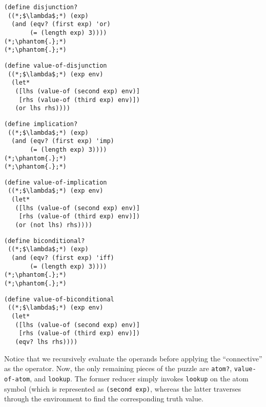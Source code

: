 \begin{clrr}[]{}
\begin{lstlisting}[language=MyScheme]
(define disjunction?
 ((*;$\lambda$;*) (exp)
  (and (eqv? (first exp) 'or)
       (= (length exp) 3))))
(*;\phantom{.};*)
(*;\phantom{.};*)
\end{lstlisting}
\tcblower
\begin{lstlisting}[language=MyNLNScheme]
(define value-of-disjunction
 ((*;$\lambda$;*) (exp env)
  (let* 
   ([lhs (value-of (second exp) env)]
    [rhs (value-of (third exp) env)])
   (or lhs rhs))))
\end{lstlisting}
\end{clrr}

\begin{clrr}[]{}
\begin{lstlisting}[language=MyScheme]
(define implication?
 ((*;$\lambda$;*) (exp)
  (and (eqv? (first exp) 'imp)
       (= (length exp) 3))))
(*;\phantom{.};*)
(*;\phantom{.};*)
\end{lstlisting}
\tcblower
\begin{lstlisting}[language=MyNLNScheme]
(define value-of-implication
 ((*;$\lambda$;*) (exp env)
  (let* 
   ([lhs (value-of (second exp) env)]
    [rhs (value-of (third exp) env)])
   (or (not lhs) rhs))))
\end{lstlisting}
\end{clrr}

\begin{clrr}[]{}
\begin{lstlisting}[language=MyScheme]
(define biconditional?
 ((*;$\lambda$;*) (exp)
  (and (eqv? (first exp) 'iff)
       (= (length exp) 3))))
(*;\phantom{.};*)
(*;\phantom{.};*)
\end{lstlisting}
\tcblower
\begin{lstlisting}[language=MyNLNScheme]
(define value-of-biconditional
 ((*;$\lambda$;*) (exp env)
  (let* 
   ([lhs (value-of (second exp) env)]
    [rhs (value-of (third exp) env)])
   (eqv? lhs rhs))))
\end{lstlisting}
\end{clrr}

Notice that we recursively evaluate the operands before applying the ``connective'' as the operator. Now, the only remaining pieces of the puzzle are \texttt{atom?}, \texttt{value-of-atom}, and \texttt{lookup}. The former reducer simply invokes \texttt{lookup} on the atom symbol (which is represented as \texttt{(second exp)}, whereas the latter traverses through the environment to find the corresponding truth value.

